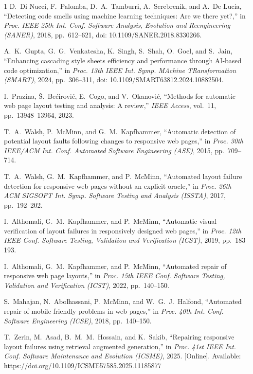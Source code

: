 \documentclass[conference]{IEEEtran}
\begin{document}
\begin{thebibliography}{1}
D.~Di Nucci, F.~Palomba, D.~A.~Tamburri, A.~Serebrenik, and
A.~De Lucia, ``Detecting code smells using machine learning
techniques: Are we there yet?,'' in \emph{Proc. IEEE 25th Int. Conf.
Software Analysis, Evolution and Reengineering (SANER)}, 2018,
pp.~612--621, doi: 10.1109/SANER.2018.8330266.

A.~K.~Gupta, G.~G.~Venkatesha, K.~Singh, S.~Shah, O.~Goel, and
S.~Jain, ``Enhancing cascading style sheets efficiency and performance
through AI-based code optimization,'' in \emph{Proc. 13th IEEE Int.
Symp. MAchine TRansformation (SMART)}, 2024, pp.~306--311,
doi: 10.1109/SMART63812.2024.10882504.

I.~Prazina, \v{S}.~Be\'{c}irovi\'{c}, E.~Cogo, and V.~Okanovi\'{c},
``Methods for automatic web page layout testing and analysis: A
review,'' \emph{IEEE Access}, vol.~11, pp.~13948--13964, 2023.

T.~A.~Walsh, P.~McMinn, and G.~M.~Kapfhammer, ``Automatic detection of
potential layout faults following changes to responsive web pages,'' in
\emph{Proc. 30th IEEE/ACM Int. Conf. Automated Software Engineering
(ASE)}, 2015, pp.~709--714.

T.~A.~Walsh, G.~M.~Kapfhammer, and P.~McMinn, ``Automated layout failure
detection for responsive web pages without an explicit oracle,'' in
\emph{Proc. 26th ACM SIGSOFT Int. Symp. Software Testing and Analysis
(ISSTA)}, 2017, pp.~192--202.

I.~Althomali, G.~M.~Kapfhammer, and P.~McMinn, ``Automatic visual
verification of layout failures in responsively designed web pages,''
in \emph{Proc. 12th IEEE Conf. Software Testing, Validation and
Verification (ICST)}, 2019, pp.~183--193.

I.~Althomali, G.~M.~Kapfhammer, and P.~McMinn, ``Automated repair of
responsive web page layouts,'' in \emph{Proc. 15th IEEE Conf. Software
Testing, Validation and Verification (ICST)}, 2022, pp.~140--150.

S.~Mahajan, N.~Abolhassani, P.~McMinn, and W.~G.~J.~Halfond,
``Automated repair of mobile friendly problems in web pages,'' in
\emph{Proc. 40th Int. Conf. Software Engineering (ICSE)}, 2018,
pp.~140--150.

T.~Zerin, M.~Asad, B.~M.~M.~Hossain, and K.~Sakib, ``Repairing
responsive layout failures using retrieval augmented generation,'' in
\emph{Proc. 41st IEEE Int. Conf. Software Maintenance and Evolution
(ICSME)}, 2025. [Online]. Available:
https://doi.org/10.1109/ICSME57585.2025.11185877


\end{thebibliography}
\end{document}
